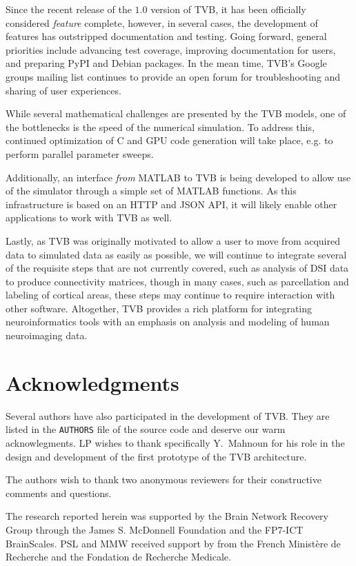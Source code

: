 \documentclass{bioinfo}
\begin{document}
Since the recent release of the $1.0$ version of TVB, it has been 
officially considered \textit{feature} complete, however, in several
cases, the development of features has outstripped documentation 
and testing. Going forward, general priorities include
advancing test coverage, improving documentation for users, and
preparing PyPI and Debian packages. In the mean
time, TVB's Google groups mailing list continues to
provide an open forum for troubleshooting and sharing of user experiences.

While several mathematical challenges are presented by the TVB models, 
one of the bottlenecks is the speed of the numerical simulation.
To address this, continued optimization of C and GPU code generation
will take place, e.g. to perform parallel parameter sweeps. 

Additionally, an interface \textit{from} MATLAB to TVB 
is being developed to allow use of the simulator through a simple
set of MATLAB functions. As this infrastructure is based on an HTTP and 
JSON API, it will likely enable other applications to work with TVB as well.

Lastly, as TVB was originally motivated to allow a user to move from acquired
data to simulated data as easily as possible, we will continue to integrate
several of the requisite steps that are not currently covered, such as analysis
of DSI data to produce connectivity matrices, though in many cases, such as
parcellation and labeling of cortical areas, these steps may continue to
require interaction with other software. Altogether, TVB provides a
rich platform for integrating neuroinformatics tools with an emphasis on
analysis and modeling of human neuroimaging data.


\section*{Acknowledgments}
Several authors have also participated in the
development of TVB. They are listed in the \texttt{AUTHORS} file 
of the source code and deserve our warm acknowlegments. LP wishes to thank
specifically Y.~Mahnoun for his role in the design and development
of the first prototype of the TVB architecture. 

The authors wish to thank two anonymous reviewers for their constructive comments
and questions.

The research reported herein
was supported by the  Brain Network Recovery Group through the James S.
McDonnell Foundation and the FP7-ICT BrainScales. PSL and MMW received
support by from the French Minist\`{e}re de Recherche and the Fondation
de Recherche Medicale.



\end{document}
